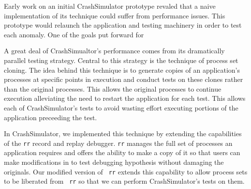 Early work on an initial CrashSimulator prototype revaled that a naive
implementation of its technique could suffer from performance issues.  This
prototype would relaunch the application and testing machinery in order to
test each anomaly.  One of the goals put forward for

A great deal of CrashSimualtor's performance comes from its dramatically
parallel testing strategy.  Central to this strategy is the technique of
process set cloning.  The idea behind this technique is to generate copies
of an application's processes at specific points in execution and conduct
tests on these clones rather than the original processes.  This allows the
original processes to continue execution alleviating the need to restart
the application for each test.  This allows each of CrashSimulator's tests
to avoid wasting effort executing portions of the application preceeding
the test.

In CrashSimulator, we implemented this technique by extending the
capabilities of the {\tt rr} record and replay debugger.  {\tt rr} manages
the full set of processes an application requires and offers the ability to
make a copy of it so that users can make modifications in to test debugging
hypothesis without damaging the originals.  Our modified version of {\tt
rr} extends this capability to allow process sets to be liberated from {\tt
rr} so that we can perform CrashSimulator's tests on them.
